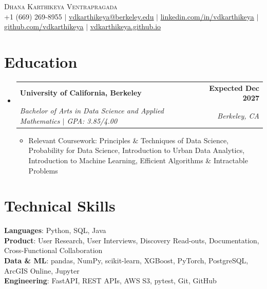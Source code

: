 \documentclass[letterpaper,11pt]{article}
\makeatletter
\newcommand{\resumeItem}[1]{%
  \item\small{{#1\vspace{-2pt}}}%
}
\newcommand{\resumeSubheading}[4]{
  \vspace{-2pt}\item
    \begin{tabular*}{1.0\textwidth}[t]{l@{\extracolsep{\fill}}r}
      \textbf{#1} & \textbf{\small #2} \\
      \textit{\small#3} & \textit{\small #4} \\
    \end{tabular*}\vspace{-7pt}
}
\newcommand{\resumeSubHeadingListStart}{\begin{itemize}[leftmargin=0.0in, label={}]}
\newcommand{\resumeSubHeadingListEnd}{\end{itemize}}
\newcommand{\resumeItemListStart}{\begin{itemize}[itemsep=2.5pt, topsep=3pt]}
\newcommand{\resumeItemListEnd}{\end{itemize}\vspace{-4pt}}
\makeatother
\begin{document}
\begin{center}
    {\Huge \scshape Dhana Karthikeya Ventrapragada} \\ \vspace{1pt}
        \footnotesize
    +1 (669) 269-8955 $|$
    \href{mailto:vdkarthikeya@berkeley.edu}{\uline{vdkarthikeya@berkeley.edu}} $|$
    \href{https://www.linkedin.com/in/vdkarthikeya/}{\uline{linkedin.com/in/vdkarthikeya}} $|$
    \href{https://github.com/vdkarthikeya}{\uline{github.com/vdkarthikeya}} $|$
    \href{https://vdkarthikeya.github.io}{\uline{vdkarthikeya.github.io}}
    \vspace{-8pt}
\end{center}

\section{Education}
\resumeSubHeadingListStart

\resumeSubheading
{University of California, Berkeley}{Expected Dec 2027}
{Bachelor of Arts in Data Science and Applied Mathematics \;$|$\; GPA: 3.85/4.00}{Berkeley, CA}

\vspace{-6pt}
\resumeItemListStart
\resumeItem{Relevant Coursework: Principles \& Techniques of Data Science, Probability for Data Science, Introduction to Urban Data Analytics, Introduction to Machine Learning, Efficient Algorithms \& Intractable Problems}
\resumeItemListEnd

\resumeSubHeadingListEnd
\vspace{-14pt}

\section{Technical Skills}
 \begin{itemize}[leftmargin=0.15in, label={}, itemsep=3pt]
    \small{\item{
     \textbf{Languages}{: Python, SQL, Java} \\[2pt]
     \textbf{Product}{: User Research, User Interviews, Discovery Read-outs, Documentation, Cross-Functional Collaboration} \\[2pt]
     \textbf{Data \& ML}{: pandas, NumPy, scikit-learn, XGBoost, PyTorch, PostgreSQL, ArcGIS Online, Jupyter} \\[2pt]
     \textbf{Engineering}{: FastAPI, REST APIs, AWS S3, pytest, Git, GitHub}
    }}
 \end{itemize}
 \vspace{-15pt}
\end{document}
